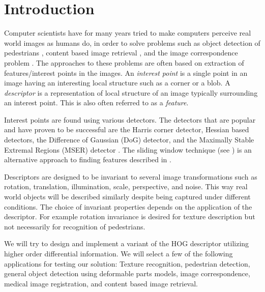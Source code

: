 \documentclass[thesis.tex]{subfiles}
\begin{document}
\section{Introduction}
\label{sec:introduction}

Computer scientists have for many years tried to make computers perceive real world images as humans do, in order to solve problems such as object detection of pedestrians \cite{felzenszwalb2008discriminatively}, content based image retrieval \cite{smeulders2000content}, and the image correspondence problem \cite{dahl2011finding}.
%
The approaches to these problems are often based on extraction of features/interest points in the images. An \emph{interest point} is a single point in an image having an interesting local structure such as a corner or a blob. A \emph{descriptor} is a representation of local structure of an image typically surrounding an interest point. This is also often referred to as a \emph{feature}.

Interest points are found using various detectors. The detectors that are popular and have proven to be successful are the Harris corner detector, Hessian based detectors, the Difference of Gaussian (DoG) detector, and the Maximally Stable Extremal Regions (MSER) detector \cite{aanaes2012interesting,dahl2011finding}. The sliding window technique (see ) is an alternative approach to finding features described in \cite{dalal2005histograms}.

Descriptors are designed to be invariant to several image transformations such as rotation, translation, illumination, scale, perspective, and noise. This way real world objects will be described similarly despite being captured under different conditions. The choice of invariant properties depends on the application of the descriptor. For example rotation invariance is desired for texture description but not necessarily for recognition of pedestrians.

We will try to design and implement a variant of the HOG descriptor utilizing higher order differential information. We will select a few of the following applications for testing our solution: Texture recognition, pedestrian detection, general object detection using deformable parts models, image correspondence, medical image registration, and content based image retrieval.
\end{document}
